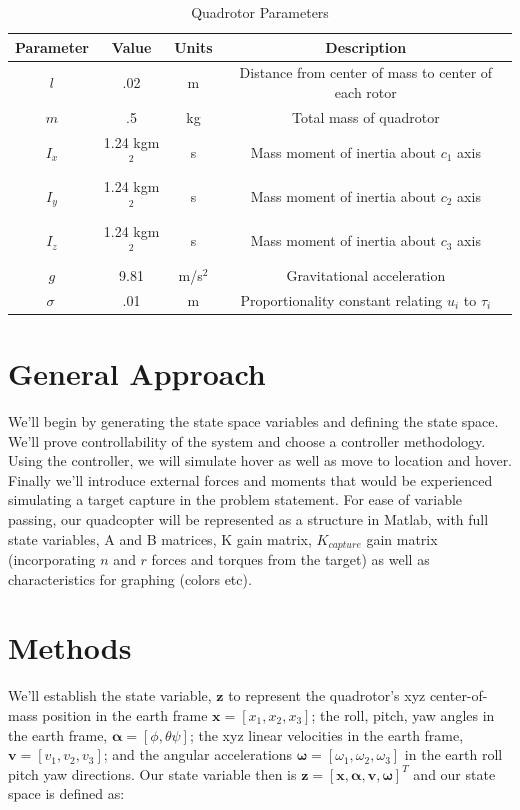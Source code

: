 \documentclass{article}
\begin{document}
\begin{multicols}{2}
\begin{table}[t] %
\begin{centering}
\begin{tabular}{|cccc|}
\hline
Parameter & Value & Units  & Description  \\
\hline
 $l$  &  .02& m & Distance from center of mass to center of each rotor  \\
 $m$& .5 & kg &Total mass of quadrotor   \\
 $I_{x}$ & 1.24 kgm$^2 $ & s  & Mass moment of inertia about $c_1$ axis \\
 $I_{y}$ & 1.24 kgm$^2 $ & s  & Mass moment of inertia about $c_2$ axis \\
 $I_{z}$ & 1.24 kgm$^2 $ & s  & Mass moment of inertia about $c_3$ axis \\
$ g$ &9.81 & m/s$^2$ & Gravitational acceleration\\
$\sigma\ $& .01 & m & Proportionality constant relating $u_i $ to $\tau_i$\\
\hline
\end{tabular}
\caption{Quadrotor Parameters}
\label{table:Qparams}
\end{centering}
\end{table}


\section*{General Approach}
We'll begin by generating the state space variables and defining the state space.  We'll prove controllability of the system and choose a controller methodology.  Using the controller, we will simulate hover as well as move to location and hover.  Finally we'll introduce external forces and moments that would be experienced simulating a target capture in the problem statement.  For ease of variable passing, our quadcopter will be represented as a structure in Matlab, with full state variables, A and B matrices, K gain matrix, $K_{capture}$ gain matrix (incorporating $n$ and $r$ forces and torques from the target) as well as characteristics for graphing (colors etc).

\section*{Methods}
We'll establish the state variable, $\mathbf{z}$ to represent the quadrotor's xyz center-of-mass position in the earth 
frame $\mathbf{x}=[x_1, x_2, x_3]$; the roll, pitch, yaw angles in the earth frame, $\bm{\alpha}=[\phi,\theta\psi]$; the xyz linear velocities in the earth frame, $\mathbf{v}=[v_1, v_2, v_3]$; and the angular accelerations $\bm{\omega}=[\omega_1, \omega_2, \omega_3]$ in the earth roll pitch yaw directions. Our state variable then is $\mathbf{z}=[\mathbf{x},\bm{\alpha},\mathbf{v},\bm{\omega}]^T$ and our state space is defined as:


\end{multicols}
\end{document}

